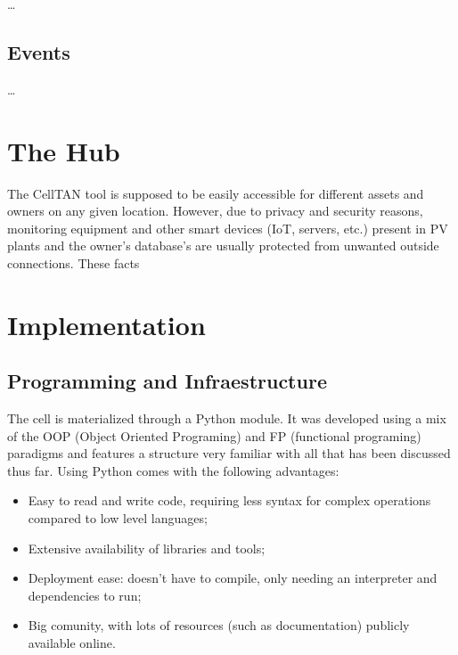 \dots


\subsection{Events}

\dots


\section{The Hub}

The CellTAN tool is supposed to be easily accessible for different assets and owners on any given location. However, due to privacy and security reasons, monitoring equipment and other smart devices (IoT, servers, etc.) present in PV plants and the owner's database's are usually protected from unwanted outside connections. These facts 


\section{Implementation}

\subsection{Programming and Infraestructure}

The cell is materialized through a Python module. It was developed using a mix of the OOP (Object Oriented Programing) and FP (functional programing) paradigms and features a structure very familiar with all that has been discussed thus far. Using Python comes with the following advantages:

\begin{itemize}
    \item Easy to read and write code, requiring less syntax for complex operations compared to low level languages;
    \item Extensive availability of libraries and tools;
    \item Deployment ease: doesn't have to compile, only needing an interpreter and dependencies to run;
    \item Big comunity, with lots of resources (such as documentation) publicly available online. 
\end{itemize}


